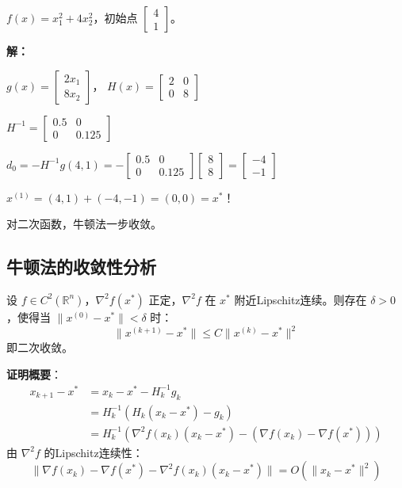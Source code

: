 \begin{example}[牛顿法解二次函数]
$f(x) = x_1^2 + 4x_2^2$，初始点 $\begin{bmatrix} 4 \\ 1 \end{bmatrix}$。

\textbf{解：}

$g(x) = \begin{bmatrix} 2x_1 \\ 8x_2 \end{bmatrix}$，
$H(x) = \begin{bmatrix} 2 & 0 \\ 0 & 8 \end{bmatrix}$

$H^{-1} = \begin{bmatrix} 0.5 & 0 \\ 0 & 0.125 \end{bmatrix}$

$d_0 = -H^{-1} g(4,1) = -\begin{bmatrix} 0.5 & 0 \\ 0 & 0.125 \end{bmatrix}\begin{bmatrix} 8 \\ 8 \end{bmatrix} = \begin{bmatrix} -4 \\ -1 \end{bmatrix}$

$x^{(1)} = (4,1) + (-4,-1) = (0, 0) = x^*$！

对二次函数，牛顿法一步收敛。
\end{example}

\subsection{牛顿法的收敛性分析}\label{sec:newton-convergence}

\begin{theorem}[局部二次收敛]
设 $f \in C^2(\mathbb{R}^n)$，$\nabla^2 f(x^*)$ 正定，$\nabla^2 f$ 在 $x^*$ 附近Lipschitz连续。则存在 $\delta > 0$，使得当 $\|x^{(0)} - x^*\| < \delta$ 时：
\[
\|x^{(k+1)} - x^*\| \leq C \|x^{(k)} - x^*\|^2
\]
即二次收敛。
\end{theorem}

\textbf{证明概要}：
\begin{align*}
x_{k+1} - x^* &= x_k - x^* - H_k^{-1} g_k \\
&= H_k^{-1}(H_k(x_k - x^*) - g_k) \\
&= H_k^{-1}(\nabla^2 f(x_k)(x_k - x^*) - (\nabla f(x_k) - \nabla f(x^*)))
\end{align*}
由 $\nabla^2 f$ 的Lipschitz连续性：
\[
\|\nabla f(x_k) - \nabla f(x^*) - \nabla^2 f(x_k)(x_k - x^*)\| = O(\|x_k - x^*\|^2)
\]

